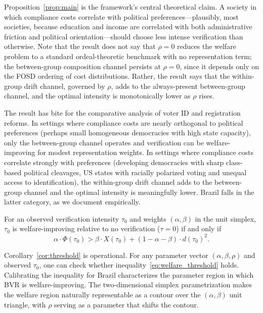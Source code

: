 Proposition~\ref{prop:main} is the framework's central theoretical claim. A society in which compliance costs correlate with political preferences---plausibly, most societies, because education and income are correlated with both administrative friction and political orientation---should choose less intense verification than otherwise. Note that the result does not say that $\rho = 0$ reduces the welfare problem to a standard ordeal-theoretic benchmark with no representation term; the between-group composition channel persists at $\rho = 0$, since it depends only on the FOSD ordering of cost distributions. Rather, the result says that the within-group drift channel, governed by $\rho$, adds to the always-present between-group channel, and the optimal intensity is monotonically lower as $\rho$ rises.

The result has bite for the comparative analysis of voter ID and registration reforms. In settings where compliance costs are nearly orthogonal to political preferences (perhaps small homogeneous democracies with high state capacity), only the between-group channel operates and verification can be welfare-improving for modest representation weights. In settings where compliance costs correlate strongly with preferences (developing democracies with sharp class-based political cleavages, US states with racially polarized voting and unequal access to identification), the within-group drift channel adds to the between-group channel and the optimal intensity is meaningfully lower. Brazil falls in the latter category, as we document empirically.

\begin{corollary}
\label{cor:threshold}
For an observed verification intensity $\tau_0$ and weights $(\alpha, \beta)$ in the unit simplex, $\tau_0$ is welfare-improving relative to no verification ($\tau = 0$) if and only if
\begin{equation}
\alpha \cdot \Phi(\tau_0) > \beta \cdot X(\tau_0) + (1 - \alpha - \beta) \cdot d(\tau_0)^2.
\label{eq:welfare_threshold}
\end{equation}
\end{corollary}

Corollary~\ref{cor:threshold} is operational. For any parameter vector $(\alpha, \beta, \rho)$ and observed $\tau_0$, one can check whether inequality~\eqref{eq:welfare_threshold} holds. Calibrating the inequality for Brazil characterizes the parameter region in which BVR is welfare-improving. The two-dimensional simplex parametrization makes the welfare region naturally representable as a contour over the $(\alpha, \beta)$ unit triangle, with $\rho$ serving as a parameter that shifts the contour.

